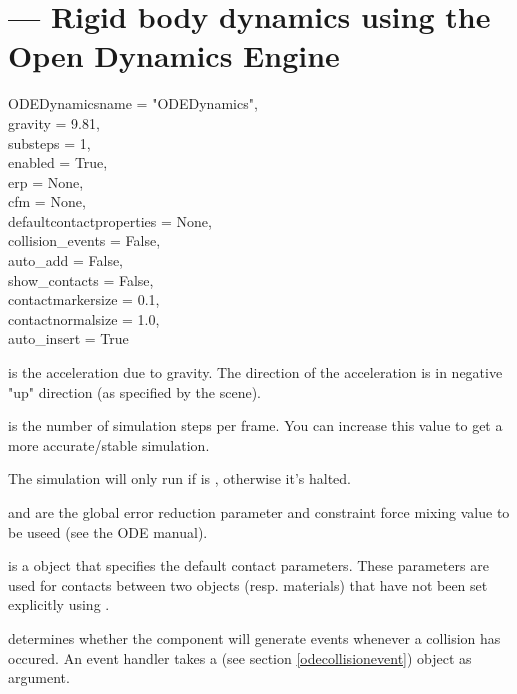 
\section{ ---
         Rigid body dynamics using the Open Dynamics Engine}

\begin{classdesc}{ODEDynamics}{name = "ODEDynamics",\\ 
			       gravity = 9.81, \\
                               substeps = 1, \\
                               enabled = True, \\
                               erp = None, \\
                               cfm = None, \\
                               defaultcontactproperties = None, \\
                               collision_events = False, \\
                               auto_add = False, \\
                               show_contacts = False, \\
                               contactmarkersize = 0.1, \\
                               contactnormalsize = 1.0, \\
                               auto_insert = True}

 is the acceleration due to gravity. The direction of the
acceleration is in negative "up" direction (as specified by the scene).

 is the number of simulation steps per frame. You can
increase this value to get a more accurate/stable simulation.

The simulation will only run if  is , otherwise
it's halted.

 and  are the global error reduction parameter and
constraint force mixing value to be useed (see the ODE manual).

 is a  object
that specifies the default contact parameters. These parameters are
used for contacts between two objects (resp. materials) that have not
been set explicitly using .

 determines whether the component will generate
 events whenever a collision has occured. An event
handler takes a  (see section 
\ref{odecollisionevent}) object as argument.


\end{classdesc}
